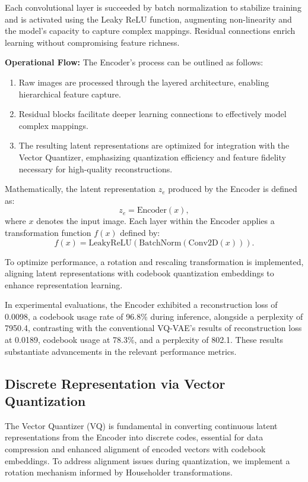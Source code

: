 Each convolutional layer is succeeded by batch normalization to stabilize training and is activated using the Leaky ReLU function, augmenting non-linearity and the model's capacity to capture complex mappings. Residual connections enrich learning without compromising feature richness.

\textbf{Operational Flow:} The Encoder's process can be outlined as follows:
\begin{enumerate}
    \item Raw images are processed through the layered architecture, enabling hierarchical feature capture.
    \item Residual blocks facilitate deeper learning connections to effectively model complex mappings.
    \item The resulting latent representations are optimized for integration with the Vector Quantizer, emphasizing quantization efficiency and feature fidelity necessary for high-quality reconstructions.
\end{enumerate}

Mathematically, the latent representation \(z_e\) produced by the Encoder is defined as:
\begin{equation}
z_e = \text{Encoder}(x),
\end{equation}
where \(x\) denotes the input image. Each layer within the Encoder applies a transformation function \(f(x)\) defined by:
\begin{equation}
f(x) = \text{LeakyReLU}\left(\text{BatchNorm}\left(\text{Conv2D}(x)\right)\right).
\end{equation}

To optimize performance, a rotation and rescaling transformation is implemented, aligning latent representations with codebook quantization embeddings to enhance representation learning.

In experimental evaluations, the Encoder exhibited a reconstruction loss of 0.0098, a codebook usage rate of 96.8\% during inference, alongside a perplexity of 7950.4, contrasting with the conventional VQ-VAE's results of reconstruction loss at 0.0189, codebook usage at 78.3\%, and a perplexity of 802.1. These results substantiate advancements in the relevant performance metrics.

\subsection{Discrete Representation via Vector Quantization}
The Vector Quantizer (VQ) is fundamental in converting continuous latent representations from the Encoder into discrete codes, essential for data compression and enhanced alignment of encoded vectors with codebook embeddings. To address alignment issues during quantization, we implement a rotation mechanism informed by Householder transformations.

